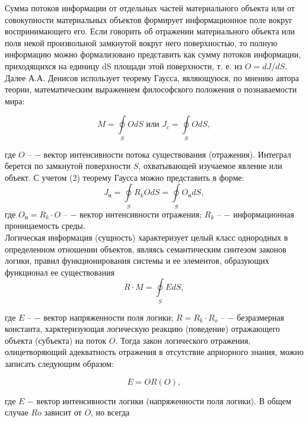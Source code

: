 \documentclass[a4paper,12pt]{report}
\begin{document}
	Сумма потоков информации от отдельных частей материального объекта или от совокупности материальных объектов формирует информационное поле вокруг воспринимающего его. Если говорить об отражении материального объекта или поля некой произвольной замкнутой вокруг него поверхностью, то полную информацию можно формализовано представить как сумму потоков информации, приходящихся на единицу dS площади этой поверхности, т. е. из $O = dJ/dS$. Далее А.А. Денисов использует теорему Гаусса, являющуюся, по мнению автора теории, математическим выражением философского положения о познаваемости мира:

\begin{equation}
\label{trivial}
	M = \oint\limits_{S}O dS \mbox{ или }	   J_c = \oint\limits_{S}O dS ,	      
\end{equation}   							
       	         
где $O \mbox{ –}$ − вектор интенсивности потока существования (отражения). Интеграл берется по замкнутой поверхности $S$, охватывающей изучаемое явление или объект. С учетом (2) теорему Гаусса можно представить в форме:
\begin{equation}
\label{trivial}
	 J_н = \oint\limits_{S} R_k O dS = \oint\limits_{S} O_н dS, 								
\end{equation} 
где $O_н = R_k \cdot O \mbox{ –}$ − вектор интенсивности отражения; $R_k \mbox{ –}$ − информационная проницаемость среды.\\

	Логическая информация (сущность) характеризует целый класс однородных в определенном отношении объектов, являясь семантическим синтезом законов логики, правил функционирования системы и ее элементов, образующих функционал ее существования 
\begin{equation}
\label{trivial}
R \cdot M = \oint\limits_{S} E dS,
\end{equation} 
	 									
где $E \mbox{ –}$ − вектор напряженности поля логики; $R = R_k \cdot R_o \mbox{ –}$ − безразмерная константа, харктеризующая логическую реакцию (поведение) отражающего объекта (субъекта) на поток $O$. Тогда закон логического отражения, олицетворяющий адекватность отражения в отсутствие априорного знания, можно записать следующим образом:

	\begin{equation}
\label{trivial}
E = O R(O),
\end{equation} 

где $E$ − вектор интенсивности логики (напряженности поля логики). В общем случае $Ro$ зависит от $O$, но всегда 
\end{document}
